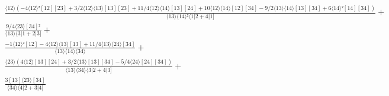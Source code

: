 \documentclass[varwidth, border=5pt]{standalone}
\begin{document}
\begin{my}
$\begin{gathered}
\scriptscriptstyle\frac{⟨12⟩(-4⟨12⟩²[12][23]+3/2⟨12⟩⟨13⟩[13][23]+11/4⟨12⟩⟨14⟩[13][24]+10⟨12⟩⟨14⟩[12][34]-9/2⟨13⟩⟨14⟩[13][34]+6⟨14⟩²[14][34])}{⟨13⟩⟨14⟩²⟨1|2+4|1]} +\\
\scriptscriptstyle\frac{9/4⟨23⟩[34]²}{⟨13⟩⟨3|1+2|3]} +\\
\scriptscriptstyle\frac{-1⟨12⟩²[12]-4⟨12⟩⟨13⟩[13]+11/4⟨13⟩⟨24⟩[34]}{⟨13⟩⟨14⟩⟨34⟩} +\\
\scriptscriptstyle\frac{⟨23⟩(4⟨12⟩[13][24]+3/2⟨13⟩[13][34]-5/4⟨24⟩[24][34])}{⟨13⟩⟨34⟩⟨3|2+4|3]} +\\
\scriptscriptstyle\frac{3[13]⟨23⟩[34]}{⟨34⟩⟨4|2+3|4]} \phantom{+}
\end{gathered}$
\end{my}
\end{document}
